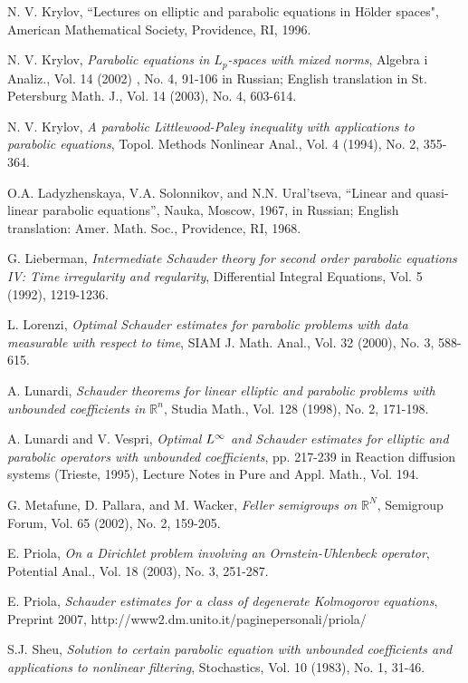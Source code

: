 \documentclass[reqno,12pt]{amsart}
\theoremstyle{definition}
\theoremstyle{remark}
\begin{document}
\begin{thebibliography}{nn}
 N. V.
 Krylov,   ``Lectures on elliptic and parabolic equations in
H\"older spaces",  American Mathematical Society, Providence, RI,
1996.

  N. V.
 Krylov,
{\em Parabolic equations in $L_{p}$-spaces with mixed norms\/},
Algebra i Analiz., Vol. 14 (2002) , No. 4, 91-106 in Russian;
English translation  in  St. Petersburg Math. J., Vol. 14 (2003),
No. 4, 603-614.

 N. V.
 Krylov, {\em
   A parabolic Littlewood-Paley inequality with
   applications to parabolic equations\/},  Topol. Methods Nonlinear
   Anal.,  Vol. 4 (1994), No. 2, 355-364.

 O.A. Ladyzhenskaya, V.A. Solonnikov, and
N.N. Ural'tseva,
 ``Linear and quasi-linear parabolic equations'',
Nauka, Moscow, 1967, in Russian; English translation: 
Amer. Math. Soc.,
Providence, RI, 1968.

  G.
   Lieberman, {\em Intermediate Schauder theory for second order
parabolic equations IV: Time irregularity and regularity\/},
Differential Integral Equations, Vol. 5 (1992),  1219-1236.

  L.
Lorenzi, {\em Optimal Schauder estimates for parabolic problems with
data measurable with respect to time\/}, SIAM J. Math. Anal., Vol.
   32 (2000), No. 3, 588-615.

 A.
Lunardi, {\em Schauder theorems for linear elliptic and parabolic
problems with unbounded coefficients in ${\mathbb{R}}^n$\/},  Studia Math.,
Vol.  128 (1998),  No. 2, 171-198.

 A.  Lunardi and V. Vespri,  
{\em Optimal $L\sp \infty$ and Schauder estimates for elliptic and
parabolic operators with unbounded coefficients\/}, pp. 217-239 in Reaction
diffusion systems (Trieste, 1995),    Lecture Notes in Pure
and Appl. Math., Vol. 194.

 G.
Metafune, D. Pallara,  and  M.  Wacker, {\em Feller semigroups on
${\mathbb{R}}^N$\/}, Semigroup Forum, Vol.   65  (2002),  No. 2, 159-205.

 E. Priola,
{\em On a Dirichlet problem involving an Ornstein-Uhlenbeck operator\/},
    Potential Anal., Vol.   18  (2003),  No. 3, 251-287.

 E. Priola, {\em Schauder estimates for a class of degenerate
Kolmogorov equations\/}, Preprint
2007, http://www2.dm.unito.it/paginepersonali/priola/ 

 S.J.  Sheu, {\em Solution to certain parabolic equation with unbounded
coefficients and
     applications to nonlinear filtering\/}, Stochastics, Vol. 10
(1983), No. 1, 31-46.

\end{thebibliography}
\end{document}
